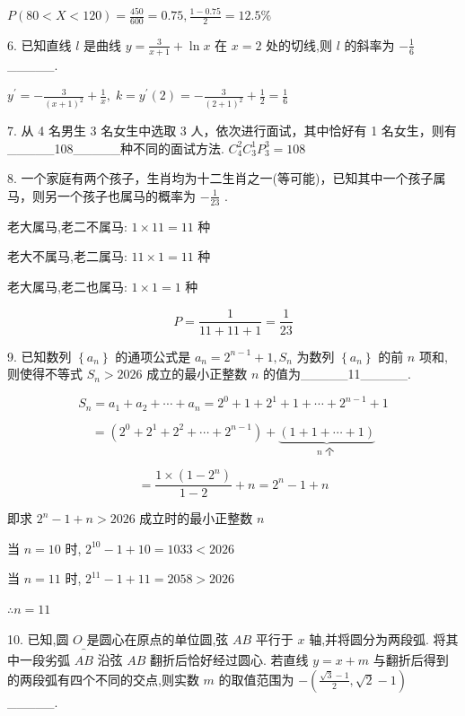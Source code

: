 \documentclass[10pt]{article}
\begin{document}
\(P\left( {{80} < X < {120}}\right)  = \frac{450}{600} = {0.75},\frac{1 - {0.75}}{2} = {12.5}\%\)

6. 已知直线 \(l\) 是曲线 \(y = \frac{3}{x + 1} + \ln x\) 在 \(x = 2\) 处的切线,则 \(l\) 的斜率为 \(- \frac{1}{6}\) \_\_\_\_\_.

\({y}^{\prime } =  - \frac{3}{{\left( x + 1\right) }^{2}} + \frac{1}{x},\;k = {y}^{\prime }\left( 2\right)  =  - \frac{3}{{\left( 2 + 1\right) }^{2}} + \frac{1}{2} = \frac{1}{6}\)

7. 从 4 名男生 3 名女生中选取 3 人，依次进行面试，其中恰好有 1 名女生，则有\_\_\_\_\_108\_\_\_\_\_种不同的面试方法. \({C}_{4}^{2}{C}_{3}^{1}{P}_{3}^{3} = {108}\)

8. 一个家庭有两个孩子，生肖均为十二生肖之一(等可能)，已知其中一个孩子属马，则另一个孩子也属马的概率为 \(- \frac{1}{23}\) .

老大属马,老二不属马: \(1 \times  {11} = {11}\) 种

老大不属马,老二属马: \({11} \times  1 = {11}\) 种

老大属马,老二也属马: \(1 \times  1 = 1\) 种

\[
P = \frac{1}{{11} + {11} + 1} = \frac{1}{23}
\]

9. 已知数列 \(\left\{  {a}_{n}\right\}\) 的通项公式是 \({a}_{n} = {2}^{n - 1} + 1,{S}_{n}\) 为数列 \(\left\{  {a}_{n}\right\}\) 的前 \(n\) 项和,则使得不等式 \({S}_{n} > {2026}\) 成立的最小正整数 \(n\) 的值为\_\_\_\_\_11\_\_\_\_\_.

\[
{S}_{n} = {a}_{1} + {a}_{2} + \cdots  + {a}_{n} = {2}^{0} + 1 + {2}^{1} + 1 + \cdots  + {2}^{n - 1} + 1
\]

\[
= \left( {{2}^{0} + {2}^{1} + {2}^{2} + \cdots  + {2}^{n - 1}}\right)  + \underset{n\text{ 个 }}{\underbrace{\left( 1 + 1 + \cdots  + 1\right) }}
\]

\[
= \frac{1 \times  \left( {1 - {2}^{n}}\right) }{1 - 2} + n = {2}^{n} - 1 + n
\]

即求 \({2}^{n} - 1 + n > {2026}\) 成立时的最小正整数 \(n\)

当 \(n = {10}\) 时, \({2}^{10} - 1 + {10} = {1033} < {2026}\)

当 \(n = {11}\) 时, \({2}^{11} - 1 + {11} = {2058} > {2026}\)

\(\therefore n = {11}\)

10. 已知,圆 \(O\) 是圆心在原点的单位圆,弦 \({AB}\) 平行于 \(x\) 轴,并将圆分为两段弧. 将其中一段劣弧 \(\overset{\text{ ⏜ }}{AB}\) 沿弦 \({AB}\) 翻折后恰好经过圆心. 若直线 \(y = x + m\) 与翻折后得到的两段弧有四个不同的交点,则实数 \(m\) 的取值范围为 \(- \left( {\frac{\sqrt{3} - 1}{2},\sqrt{2} - 1}\right)\) \_\_\_\_\_.
\end{document}
